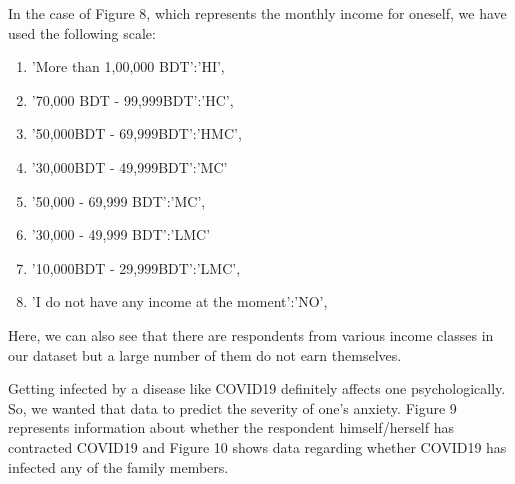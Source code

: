\documentclass[12pt, english]{article}
\begin{document}
In the case of Figure 8, which represents the monthly income for oneself, we have used the following scale: 
\begin{multicols}{2}
\begin{enumerate}
  \item 'More than 1,00,000 BDT':'HI', 
  \item '70,000 BDT - 99,999BDT':'HC',
  \item '50,000BDT - 69,999BDT':'HMC', 
  \item '30,000BDT - 49,999BDT':'MC'
  \item '50,000 - 69,999 BDT':'MC',  
  \item '30,000 - 49,999 BDT':'LMC'
  \item '10,000BDT - 29,999BDT':'LMC', 
  \item 'I do not have any income at the moment':'NO',
\end{enumerate}
\end{multicols}
\noindent Here, we can also see that there are respondents from various income classes in our dataset but a large number of them do not earn themselves. 

Getting infected by a disease like COVID19 definitely affects one psychologically. So, we wanted that data to predict the severity of one’s anxiety. Figure 9 represents information about whether the respondent himself/herself has contracted COVID19 and Figure 10 shows data regarding whether COVID19 has infected any of the family members. 
\end{document}

